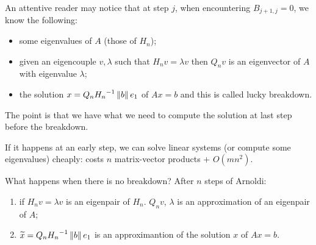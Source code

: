 \documentclass[ComputationalMathematics.tex]{subfiles}
\begin{document}
An attentive reader may notice that at step $j$, when encountering $B_{j+1, j} = 0$, we know the following:
\begin{itemize}
  \item some eigenvalues of $A$ (those of $H_n$);
  \item given an eigencouple $v, \lambda$ such that $H_n v = \lambda v$ then $Q_n v$ is an eigenvector of $A$ with eigenvalue $\lambda$;
  \item the solution $x = Q_n{H_n}^{-1}\left\lVert b\right\rVert e_1$ of $Ax=b$ and this is called lucky breakdown.
\end{itemize}

The point is that we have what we need to compute the solution at last step before the breakdown.

\begin{theorem}
If it happens at an early step, we can solve linear systems (or compute some eigenvalues) cheaply: costs $n$ matrix-vector products + $O(mn^2)$.
\end{theorem}

What happens when there is no breakdown? After $n$ steps of Arnoldi:
\begin{enumerate}
  \item if $H_n v = \lambda v$ is an eigenpair of $H_n$. $Q_n v$, $\lambda$ is an approximation of an eigenpair of $A$;
  \item $\widetilde{x}=Q_n {H_n}^{-1} \left\lVert b\right\rVert e_1$ is an approximantion of the solution $x$ of $Ax=b$.
\end{enumerate}
\end{document}
